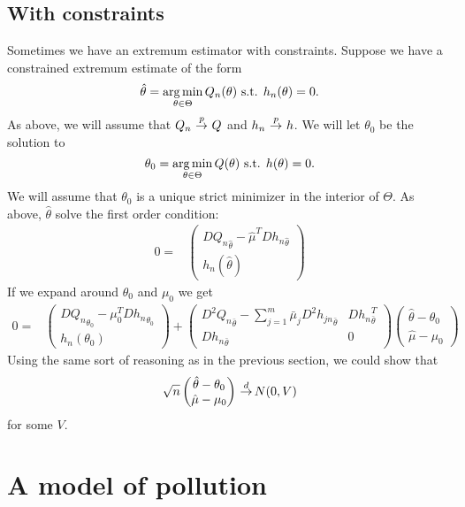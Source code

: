 \documentclass[12pt,reqno]{amsart}
\theoremstyle{definition}
\newcommand{\argmin}{\operatornamewithlimits{arg\,min}}
\def\inprobHIGH{\,{\buildrel p \over \rightarrow}\,}
\def\inprob{\,{\inprobHIGH}\,}
\def\indist{\,{\buildrel d \over \rightarrow}\,}
\begin{document}
\subsection{With constraints}
Sometimes we have an extremum estimator with constraints. Suppose we
have a constrained extremum estimate of the form
\[ \hat{\theta} = \argmin_{\theta \in \Theta} Q_n(\theta) \text{
  s.t. } h_n(\theta) = 0. \]
As above, we will assume that $Q_n \inprob Q$ and $h_n \inprob h$. We
will let $\theta_0$ be the solution to 
\[ \theta_0 = \argmin_{\theta \in \Theta} Q(\theta) \text{
  s.t. } h(\theta) = 0. \]
We will assume that $\theta_0$ is a unique strict minimizer in the
interior of $\Theta$. As above, $\hat{\theta}$ solve the first order
condition:
\begin{align*}
  0 = & \begin{pmatrix} D{Q_n}_{\hat{\theta}} - \hat{\mu}^T
    D{h_n}_{\hat{\theta}} \\
    h_n(\hat{\theta}) 
  \end{pmatrix}
\end{align*}
If we expand around $\theta_0$ and $\mu_0$ we get
\begin{align*}
  0 = & \begin{pmatrix} D{Q_n}_{\theta_0} - \mu_0^T
    D{h_n}_{\theta_0} \\
    h_n(\theta_0) 
  \end{pmatrix} + 
  \begin{pmatrix} 
    D^2 {Q_n}_{\bar{\theta}} - \sum_{j=1}^m \bar{\mu}_j D^2
    {h_{jn}}_{\bar{\theta}} & D{h_n}_{\bar{\theta}}^T \\
    D{h_n}_{\bar{\theta}} & 0 
  \end{pmatrix} 
  \begin{pmatrix} 
    \hat{\theta} - \theta_0 \\
    \hat{\mu} - \mu_0 
  \end{pmatrix}
\end{align*}
Using the same sort of reasoning as in the previous section, we could
show that
\begin{align*}
  \sqrt{n}   \begin{pmatrix} 
    \hat{\theta} - \theta_0 \\
    \hat{\mu} - \mu_0 
  \end{pmatrix}
  \indist N(0,V)
\end{align*}
for some $V$. 

\section{A model of pollution}
\end{document}
